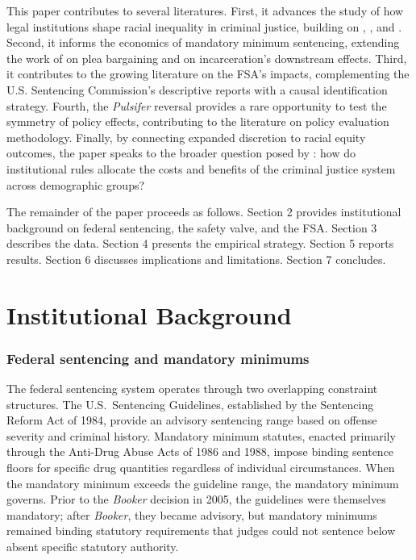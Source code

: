 \documentclass[12pt]{article}
\begin{document}
This paper contributes to several literatures. First, it advances the study of how legal institutions shape racial inequality in criminal justice, building on \citet{dobbie2018effects}, \citet{rehavi2014racial}, and \citet{aganstarr2018ban}. Second, it informs the economics of mandatory minimum sentencing, extending the work of \citet{tuttle2019snitch} on plea bargaining and \citet{muellersmith2015} on incarceration's downstream effects. Third, it contributes to the growing literature on the FSA's impacts, complementing the U.S. Sentencing Commission's descriptive reports \citep{ussc2020firststep} with a causal identification strategy. Fourth, the \textit{Pulsifer} reversal provides a rare opportunity to test the symmetry of policy effects, contributing to the literature on policy evaluation methodology. Finally, by connecting expanded discretion to racial equity outcomes, the paper speaks to the broader question posed by \citet{dobbie2015debt}: how do institutional rules allocate the costs and benefits of the criminal justice system across demographic groups?

The remainder of the paper proceeds as follows. Section 2 provides institutional background on federal sentencing, the safety valve, and the FSA. Section 3 describes the data. Section 4 presents the empirical strategy. Section 5 reports results. Section 6 discusses implications and limitations. Section 7 concludes.


\section{Institutional Background}

\subsubsection*{Federal sentencing and mandatory minimums}
The federal sentencing system operates through two overlapping constraint structures. The U.S.\ Sentencing Guidelines, established by the Sentencing Reform Act of 1984, provide an advisory sentencing range based on offense severity and criminal history. Mandatory minimum statutes, enacted primarily through the Anti-Drug Abuse Acts of 1986 and 1988, impose binding sentence floors for specific drug quantities regardless of individual circumstances. When the mandatory minimum exceeds the guideline range, the mandatory minimum governs. Prior to the \textit{Booker} decision in 2005, the guidelines were themselves mandatory; after \textit{Booker}, they became advisory, but mandatory minimums remained binding statutory requirements that judges could not sentence below absent specific statutory authority.
\end{document}
